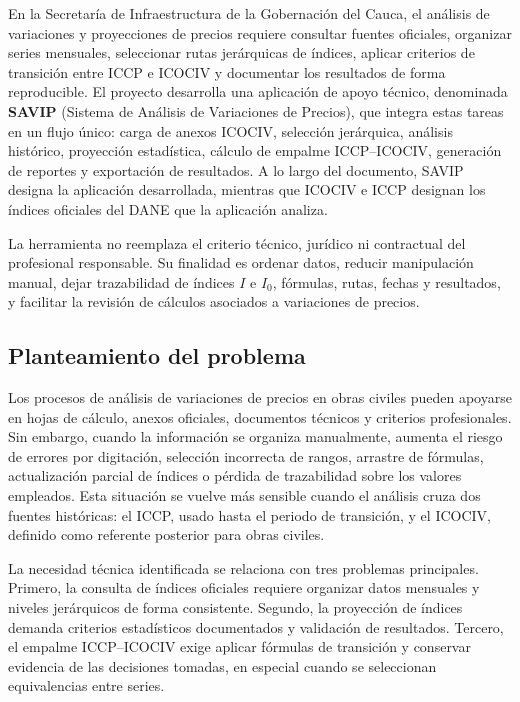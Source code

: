 \documentclass[12pt,letterpaper]{article}
\newcommand{\ICOCIV}{ICOCIV}
\newcommand{\ICCP}{ICCP}
\newcommand{\DANE}{DANE}
\begin{document}
En la Secretaría de Infraestructura de la Gobernación del Cauca, el análisis de variaciones y proyecciones de precios requiere consultar fuentes oficiales, organizar series mensuales, seleccionar rutas jerárquicas de índices, aplicar criterios de transición entre \ICCP{} e \ICOCIV{} y documentar los resultados de forma reproducible. El proyecto desarrolla una aplicación de apoyo técnico, denominada \textbf{SAVIP} (Sistema de Análisis de Variaciones de Precios), que integra estas tareas en un flujo único: carga de anexos \ICOCIV, selección jerárquica, análisis histórico, proyección estadística, cálculo de empalme \ICCP--\ICOCIV, generación de reportes y exportación de resultados. A lo largo del documento, SAVIP designa la aplicación desarrollada, mientras que \ICOCIV{} e \ICCP{} designan los índices oficiales del \DANE{} que la aplicación analiza.

La herramienta no reemplaza el criterio técnico, jurídico ni contractual del profesional responsable. Su finalidad es ordenar datos, reducir manipulación manual, dejar trazabilidad de índices \(I\) e \(I_0\), fórmulas, rutas, fechas y resultados, y facilitar la revisión de cálculos asociados a variaciones de precios.

\subsection{Planteamiento del problema}

Los procesos de análisis de variaciones de precios en obras civiles pueden apoyarse en hojas de cálculo, anexos oficiales, documentos técnicos y criterios profesionales. Sin embargo, cuando la información se organiza manualmente, aumenta el riesgo de errores por digitación, selección incorrecta de rangos, arrastre de fórmulas, actualización parcial de índices o pérdida de trazabilidad sobre los valores empleados. Esta situación se vuelve más sensible cuando el análisis cruza dos fuentes históricas: el \ICCP, usado hasta el periodo de transición, y el \ICOCIV, definido como referente posterior para obras civiles.

La necesidad técnica identificada se relaciona con tres problemas principales. Primero, la consulta de índices oficiales requiere organizar datos mensuales y niveles jerárquicos de forma consistente. Segundo, la proyección de índices demanda criterios estadísticos documentados y validación de resultados. Tercero, el empalme \ICCP--\ICOCIV{} exige aplicar fórmulas de transición y conservar evidencia de las decisiones tomadas, en especial cuando se seleccionan equivalencias entre series.
\end{document}
